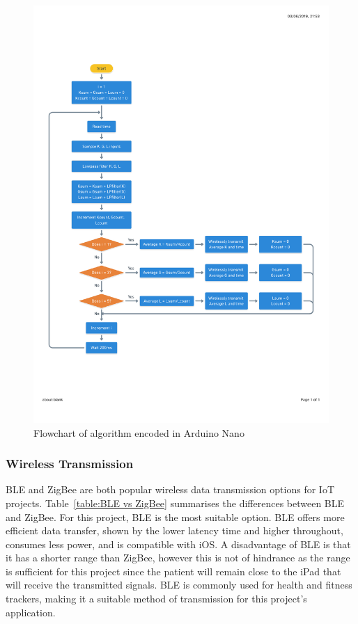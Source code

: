 \begin{figure}[t!]
\centering
\includegraphics[trim={1cm 5cm 1cm  4cm}, clip, width=1\textwidth]{./figures/psuedocode.pdf}
\captionsetup{justification=centering}
\caption{Flowchart of algorithm encoded in Arduino Nano}
\label{fig: psuedocode}
\end{figure}



\subsubsection{Wireless Transmission}
BLE and ZigBee are both popular wireless data transmission options for IoT projects. Table~\ref{table:BLE vs ZigBee} summarises the differences between BLE and ZigBee. For this project, BLE is the most suitable option. BLE offers more efficient data transfer, shown by the lower latency time and higher throughout, consumes less power, and is compatible with iOS. A disadvantage of BLE is that it has a shorter range than ZigBee, however this is not of hindrance as the range is sufficient for this project since the patient will remain close to the iPad that will receive the transmitted signals. BLE is commonly used for health and fitness trackers, making it a suitable method of transmission for this project's application.

